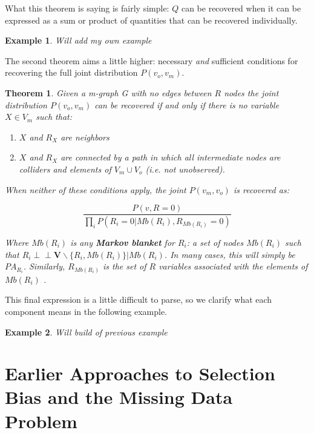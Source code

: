 \documentclass[12pt,twoside]{reedthesis}
\newtheorem{theorem}{Theorem}
\newtheorem{example}{Example}
\theoremstyle{definition}
\newcommand{\dsep}{\perp \!\!\!\perp}
\begin{document}
What this theorem is saying is fairly simple:  $Q$ can be recovered when it can be expressed as a sum or product of quantities that can be recovered individually.

\begin{example}
Will add my own example
\end{example}

The second theorem aims a little higher: necessary \emph{and} sufficient conditions for recovering the full joint distribution $P(v_o, v_m)$.

\begin{theorem}
Given a m-graph G with no edges between $R$ nodes the joint distribution $P(v_o, v_m)$ can be recovered if and only if there is no variable $X \in V_m$ such that:
\begin{enumerate}
\item $X$ and $R_X$ are neighbors

\item $X$ and $R_X$ are connected by a path in which all intermediate nodes are colliders and elements of $V_m \cup V_o$ (i.e. not unobserved).
\end{enumerate}

When neither of these conditions apply, the joint $P(v_m, v_o)$ is recovered as:

$$\frac{P(v, R=0)}{\prod_i P(R_i = 0 | Mb(R_i), R_{Mb(R_i)} = 0)}$$

Where $Mb(R_i)$ is any \textbf{Markov blanket} for $R_i$: a set of nodes $Mb(R_i)$ such that $R_i \dsep \mathbf{V} \backslash \{R_i, Mb(R_i)\} | Mb(R_i)$. In many cases, this will simply be $PA_{R_i}$. Similarly, $R_{Mb(R_i)}$ is the set of $R$ variables associated with the elements of $Mb(R_i)$ \citep{Mohan_2019}.
\end{theorem}

This final expression is a little difficult to parse, so we clarify what each component means in the following example.
\begin{example}
Will build of previous example
\end{example}

\chapter{Earlier Approaches to Selection Bias and the Missing Data Problem}
\end{document}
